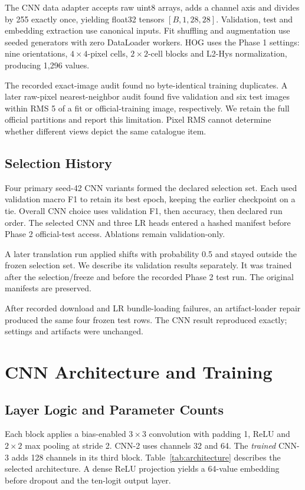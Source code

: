 \documentclass[conference]{IEEEtran}
\begin{document}
The CNN data adapter accepts raw uint8 arrays, adds a channel axis and divides
by 255 exactly once, yielding float32 tensors $[B,1,28,28]$. Validation, test
and embedding extraction use canonical inputs. Fit shuffling and augmentation
use seeded generators with zero DataLoader workers. HOG uses the Phase 1
settings: nine orientations, $4\times4$-pixel cells, $2\times2$-cell blocks and
L2-Hys normalization, producing 1,296 values.

The recorded exact-image audit found no byte-identical training duplicates.
A later raw-pixel nearest-neighbor audit found five validation and six test
images within RMS 5 of a fit or official-training image, respectively. We retain
the full official partitions and report this limitation. Pixel RMS cannot
determine whether different views depict the same catalogue item.

\subsection{Selection History}
Four primary seed-42 CNN variants formed the declared selection set. Each used
validation macro F1 to retain its best epoch, keeping the earlier checkpoint on
a tie. Overall CNN choice uses validation F1, then accuracy, then declared run
order. The selected CNN and three LR heads entered a hashed manifest before
Phase 2 official-test access. Ablations remain validation-only.

A later translation run applied shifts with probability 0.5 and stayed outside
the frozen selection set. We describe its validation results separately. It
was trained after the selection/freeze and before the recorded Phase 2 test run.
The original manifests are preserved.

After recorded download and LR bundle-loading failures, an artifact-loader repair
produced the same four frozen test rows. The CNN result reproduced exactly;
settings and artifacts were unchanged.

\section{CNN Architecture and Training}
\subsection{Layer Logic and Parameter Counts}
Each block applies a bias-enabled $3\times3$ convolution with padding 1, ReLU
and $2\times2$ max pooling at stride 2. CNN-2 uses channels 32 and 64. The
\emph{trained} CNN-3 adds 128 channels in its third block. Table~\ref{tab:architecture}
describes the selected architecture. A dense ReLU projection yields a 64-value
embedding before dropout and the ten-logit output layer.
\end{document}

